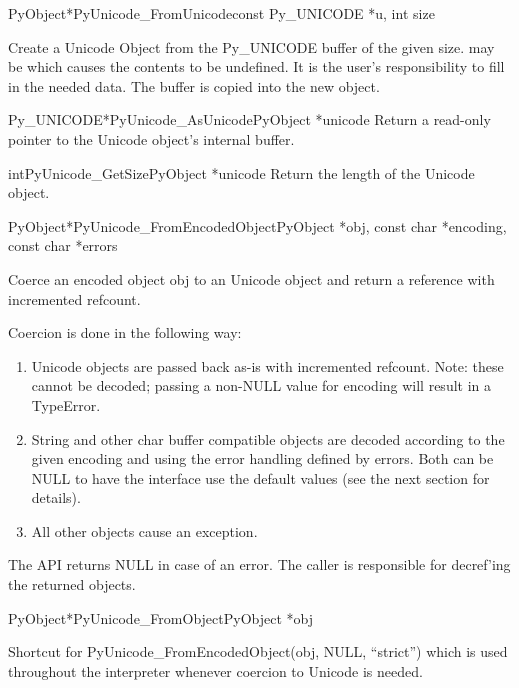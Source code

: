 \documentclass{manual}
\begin{document}
\begin{cfuncdesc}{PyObject*}{PyUnicode_FromUnicode}{const Py_UNICODE *u,
                                                    int size} 

Create a Unicode Object from the Py_UNICODE buffer  of the
given size.  may be \NULL{} which causes the contents to be
undefined. It is the user's responsibility to fill in the needed data.
The buffer is copied into the new object.
\end{cfuncdesc}

\begin{cfuncdesc}{Py_UNICODE*}{PyUnicode_AsUnicode}{PyObject *unicode}
Return a read-only pointer to the Unicode object's internal
 buffer.
\end{cfuncdesc}

\begin{cfuncdesc}{int}{PyUnicode_GetSize}{PyObject *unicode}
Return the length of the Unicode object.
\end{cfuncdesc}

\begin{cfuncdesc}{PyObject*}{PyUnicode_FromEncodedObject}{PyObject *obj,
                                                      const char *encoding,
                                                      const char *errors}

Coerce an encoded object obj to an Unicode object and return a
reference with incremented refcount.

Coercion is done in the following way:
\begin{enumerate}
\item  Unicode objects are passed back as-is with incremented
      refcount. Note: these cannot be decoded; passing a non-NULL
      value for encoding will result in a TypeError.

\item String and other char buffer compatible objects are decoded
      according to the given encoding and using the error handling
      defined by errors. Both can be NULL to have the interface use
      the default values (see the next section for details).

\item All other objects cause an exception.
\end{enumerate}
The API returns NULL in case of an error. The caller is responsible
for decref'ing the returned objects.
\end{cfuncdesc}

\begin{cfuncdesc}{PyObject*}{PyUnicode_FromObject}{PyObject *obj}

Shortcut for PyUnicode_FromEncodedObject(obj, NULL, ``strict'')
which is used throughout the interpreter whenever coercion to
Unicode is needed.
\end{cfuncdesc}
\end{document}
